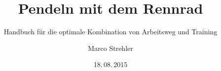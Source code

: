 \documentclass[a4paper,DIV13,BCOR1cm]{scrbook}
\begin{document}

\title{Pendeln mit dem Rennrad}
\subtitle{Handbuch für die optimale Kombination von Arbeitsweg und Training}  
\author{Marco Strehler}
\date{18.\,08.\,2015}
\dedication{Harden The Fuck Up.\\
        Velominati, Rule \#5}
\frontmatter
\maketitle



\tableofcontents

\mainmatter












\backmatter



\end{document}
